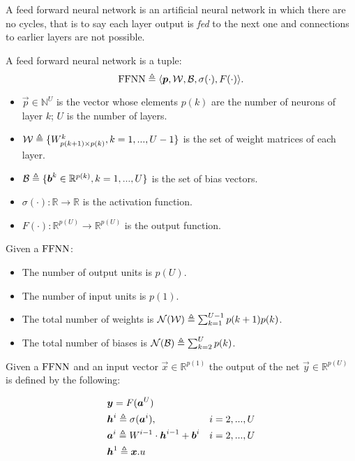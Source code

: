
A feed forward neural network is an artificial neural network in which there are no cycles, that is to say each layer output is \textit{fed} to the 
next one and connections to earlier layers are not possible. 


\begin{defn}
\label{def_ffnn}
A feed forward neural network is a tuple:
$$\mathrm{FFNN}\triangleq \langle\boldsymbol{p},\mathcal{W},\mathcal{B},\sigma(\cdot),F(\cdot)\rangle.$$
\begin{itemize}
 \item $\vec{p} \in \mathbb{N}^U$ is the vector whose elements $p(k)$ are the number of neurons of layer $k$; $U$ is the number of layers.
 \item $\mathcal{W} \triangleq \{W^k_{p(k+1) \times p(k)}, k=1,...,U-1 \}$ is the set of weight matrices of each layer.
 \item $\mathcal{B} \triangleq \{\boldsymbol{b}^k \in \mathbb{R}^{p(k)}, k=1,...,U \} $ is the set of bias vectors.
 \item $\sigma(\cdot): \mathbb{R}\rightarrow \mathbb{R}$ is the activation function.
 \item $F(\cdot): \mathbb{R}^{p(U)}\rightarrow \mathbb{R}^{p(U)}$ is the output function.
\end{itemize}
\end{defn}

\begin{remark}{}
Given a $\mathrm{FFNN}$:
\begin{itemize}
 \item The number of output units is $p(U)$.
 \item The number of input units is $p(1)$.
 \item The total number of weights is $\mathcal{N}(\mathcal{W}) \triangleq \sum_{k=1}^{U-1} p(k+1)p(k)$.
 \item The total number of biases is $\mathcal{N}(\mathcal{B}) \triangleq \sum_{k=2}^{U} p(k)$.
\end{itemize}
\end{remark}

\begin{defn}
Given a $\mathrm{FFNN}$ and an input vector $\vec{x} \in \mathbb{R}^{p(1)}$ the output of the net $\vec{y} \in \mathbb{R}^{p(U)}$  is defined by the following:

\begin{align}
&\boldsymbol{y}=F(\boldsymbol{a}^{U}) &\\
&\boldsymbol{h}^{i} \triangleq \sigma(\boldsymbol{a}^{i}), & i=2,...,U\\
&\boldsymbol{a}^{i} \triangleq W^{i-1} \cdot \boldsymbol{h}^{i-1} +\boldsymbol{b}^i  & i=2,...,U\\
&\boldsymbol{h}^{1} \triangleq \boldsymbol{x}.u &
\end{align}
\end{defn}

